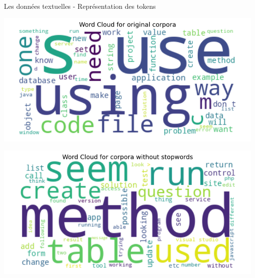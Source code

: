 \documentclass[10pt]{beamer}
\begin{document}
\begin{frame}{Les données textuelles - Représentation des tokens}
\begin{minipage}{0.48\linewidth}
    \begin{center}
       \includegraphics[width=\linewidth]{figures/word_cloud_corpora.png}
    \end{center}
\end{minipage}
\begin{minipage}{0.48\linewidth}
    \begin{center}
       \includegraphics[width=\linewidth]{figures/word_cloud_corpora2.png}
    \end{center}
\end{minipage}
\end{frame}


\end{document}

